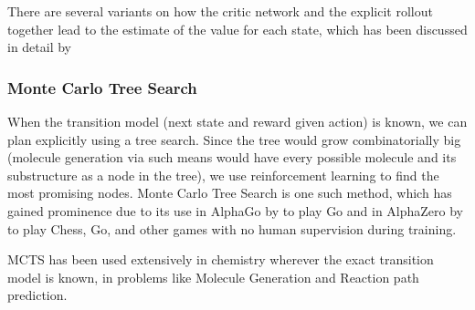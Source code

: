 There are several variants on how the critic network and the explicit rollout together lead to the estimate of the value for each state, which has been discussed in detail by \cite{actor-critic-a2c, actor-critic-a3c, actor-critic-gae}

\subsubsection{Monte Carlo Tree Search}

When the transition model (next state and reward given action) is known, we can plan explicitly using a tree search. Since the tree would grow combinatorially big (molecule generation via such means would have every possible molecule and its substructure as a node in the tree), we use reinforcement learning to find the most promising nodes. Monte Carlo Tree Search is one such method, which has gained prominence due to its use in AlphaGo by \cite{mcts-alphago} to play Go and in AlphaZero by \cite{mcts-alphazero} to play Chess, Go, and other games with no human supervision during training. 

MCTS has been used extensively in chemistry wherever the exact transition model is known, in problems like Molecule Generation and Reaction path prediction. 
